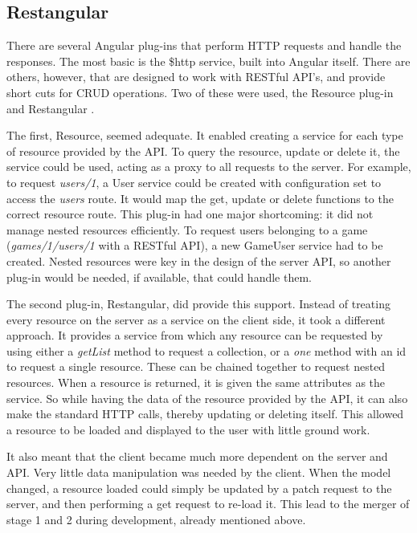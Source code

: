 \subsection{Restangular}
There are several Angular plug-ins that perform HTTP requests and handle the responses. The most basic is the \$http service, built into Angular itself. There are others, however, that are designed to work with RESTful API's, and provide short cuts for CRUD operations. Two of these were used, the Resource \cite{AngularResource} plug-in and Restangular \cite{Restangular}.

The first, Resource, seemed adequate. It enabled creating a service for each type of resource provided by the API. To query the resource, update or delete it, the service could be used, acting as a proxy to all requests to the server. For example, to request \textit{users/1}, a User service could be created with configuration set to access the \textit{users} route. It would map the get, update or delete functions to the correct resource route. This plug-in had one major shortcoming: it did not manage nested resources efficiently. To request users belonging to a game (\textit{games/1/users/1} with a RESTful API), a new GameUser service had to be created. Nested resources were key in the design of the server API, so another plug-in would be needed, if available, that could handle them.

The second plug-in, Restangular, did provide this support. Instead of treating every resource on the server as a service on the client side, it took a different approach. It provides a service from which any resource can be requested by using either a \textit{getList} method to request a collection, or a \textit{one} method with an id to request a single resource. These can be chained together to request nested resources. When a resource is returned, it is given the same attributes as the service. So while having the data of the resource provided by the API, it can also make the standard HTTP calls, thereby updating or deleting itself. This allowed a resource to be loaded and displayed to the user with little ground work.

It also meant that the client became much more dependent on the server and API. Very little data manipulation was needed by the client. When the model changed, a resource loaded could simply be updated by a patch request to the server, and then performing a get request to re-load it. This lead to the merger of stage 1 and 2 during development, already mentioned above.
	
